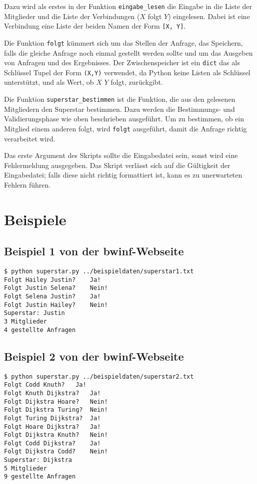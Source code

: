 \documentclass[a4paper,10pt,ngerman]{scrartcl}
\begin{document}
Dazu wird als erstes in der Funktion \texttt{eingabe\_lesen} die Eingabe in die Liste der Mitglieder und die Liste der Verbindungen ($X$ folgt $Y$) eingelesen. Dabei ist eine Verbindung eine Liste der beiden Namen der Form \texttt{[X, Y]}. 

Die Funktion \texttt{folgt} kümmert sich um das Stellen der Anfrage, das Speichern, falls die gleiche Anfrage noch einmal gestellt werden sollte und um das Ausgeben von Anfragen und des Ergebnisses. Der Zwischenspeicher ist ein \texttt{dict} das als Schlüssel Tupel der Form \texttt{(X,Y)} verwendet, da Python keine Listen als Schlüssel unterstützt, und als Wert, ob $X$ $Y$ folgt, zurückgibt. 

Die Funktion \texttt{superstar\_bestimmen} ist die Funktion, die aus den gelesenen Mitgliedern den Superstar bestimmen. Dazu werden die Bestimmungs- und Validierungsphase wie oben beschrieben ausgeführt. Um zu bestimmen, ob ein Mitglied einem anderen folgt, wird \texttt{folgt} ausgeführt, damit die Anfrage richtig verarbeitet wird.

Das erste Argument des Skripts sollte die Eingabedatei sein, sonst wird eine Fehlermeldung ausgegeben. Das Skript verlässt sich auf die Gültigkeit der Eingabedatei; falls diese nicht richtig formattiert ist, kann es zu unerwarteten Fehlern führen.

\section{Beispiele}

\subsection{Beispiel 1 von der bwinf-Webseite}
\begin{lstlisting}
$ python superstar.py ../beispieldaten/superstar1.txt
Folgt Hailey Justin? 	Ja!
Folgt Justin Selena? 	Nein!
Folgt Selena Justin? 	Ja!
Folgt Justin Hailey? 	Nein!
Superstar: Justin
3 Mitglieder
4 gestellte Anfragen
\end{lstlisting}

\subsection{Beispiel 2 von der bwinf-Webseite}
\begin{lstlisting}
$ python superstar.py ../beispieldaten/superstar2.txt
Folgt Codd Knuth? 	Ja!
Folgt Knuth Dijkstra? 	Ja!
Folgt Dijkstra Hoare? 	Nein!
Folgt Dijkstra Turing? 	Nein!
Folgt Turing Dijkstra? 	Ja!
Folgt Hoare Dijkstra? 	Ja!
Folgt Dijkstra Knuth? 	Nein!
Folgt Codd Dijkstra? 	Ja!
Folgt Dijkstra Codd? 	Nein!
Superstar: Dijkstra
5 Mitglieder
9 gestellte Anfragen
\end{lstlisting}
\end{document}
